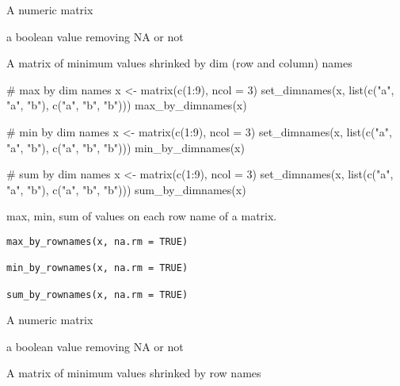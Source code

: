 \documentclass[letterpaper]{book}
\begin{document}
%
\begin{Arguments}
\begin{ldescription}
\item[\code{x}] A numeric matrix

\item[\code{na.rm}] a boolean value removing NA or not
\end{ldescription}
\end{Arguments}
%
\begin{Value}
A matrix of minimum values shrinked by dim (row and column) names
\end{Value}
%
\begin{Examples}
\begin{ExampleCode}
# max by dim names
x <- matrix(c(1:9), ncol = 3)
set_dimnames(x, list(c("a", "a", "b"), c("a", "b", "b")))
max_by_dimnames(x)

# min by dim names
x <- matrix(c(1:9), ncol = 3)
set_dimnames(x, list(c("a", "a", "b"), c("a", "b", "b")))
min_by_dimnames(x)

# sum by dim names
x <- matrix(c(1:9), ncol = 3)
set_dimnames(x, list(c("a", "a", "b"), c("a", "b", "b")))
sum_by_dimnames(x)

\end{ExampleCode}
\end{Examples}
%
\begin{Description}
max, min, sum of values on each row name of a matrix.
\end{Description}
%
\begin{Usage}
\begin{verbatim}
max_by_rownames(x, na.rm = TRUE)

min_by_rownames(x, na.rm = TRUE)

sum_by_rownames(x, na.rm = TRUE)
\end{verbatim}
\end{Usage}
%
\begin{Arguments}
\begin{ldescription}
\item[\code{x}] A numeric matrix

\item[\code{na.rm}] a boolean value removing NA or not
\end{ldescription}
\end{Arguments}
%
\begin{Value}
A matrix of minimum values shrinked by row names
\end{Value}
\end{document}
